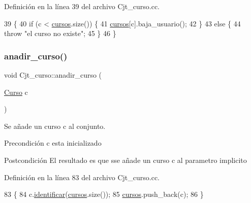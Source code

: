 Definición en la línea 39 del archivo Cjt\+\_\+curso.\+cc.


\begin{DoxyCode}
39                                   \{
40   \textcolor{keywordflow}{if} (c < \mbox{\hyperlink{class_cjt__curso_af8d4def315cf56b9aab3328bf80bb32c}{cursos}}.size()) \{
41     \mbox{\hyperlink{class_cjt__curso_af8d4def315cf56b9aab3328bf80bb32c}{cursos}}[c].baja\_usuario();
42   \}
43   \textcolor{keywordflow}{else} \{
44     \textcolor{keywordflow}{throw} \textcolor{stringliteral}{"el curso no existe"};
45   \}
46 \}
\end{DoxyCode}
\mbox{\label{class_cjt__curso_a8b79841cba9bb04c08a23e9dc376dd24}} 
\subsubsection{\texorpdfstring{anadir\+\_\+curso()}{anadir\_curso()}}
{\footnotesize\ttfamily void Cjt\+\_\+curso\+::anadir\+\_\+curso (\begin{DoxyParamCaption}\item[{\mbox{\hyperlink{class_curso}{Curso}}}]{c }\end{DoxyParamCaption})}



Se añade un curso c al conjunto. 

\begin{DoxyPrecond}{Precondición}
c esta inicializado 
\end{DoxyPrecond}
\begin{DoxyPostcond}{Postcondición}
El resultado es que sse añade un curso c al parametro implicito 
\end{DoxyPostcond}


Definición en la línea 83 del archivo Cjt\+\_\+curso.\+cc.


\begin{DoxyCode}
83                                     \{
84   c.\mbox{\hyperlink{class_curso_a88963d0571e8633bf77f7508e02a031b}{identificar}}(\mbox{\hyperlink{class_cjt__curso_af8d4def315cf56b9aab3328bf80bb32c}{cursos}}.size());
85   \mbox{\hyperlink{class_cjt__curso_af8d4def315cf56b9aab3328bf80bb32c}{cursos}}.push\_back(c);
86 \}
\end{DoxyCode}
\mbox{\label{class_cjt__curso_a7e15ba1bdb4d1de93862a8c56dde53e5}} 
